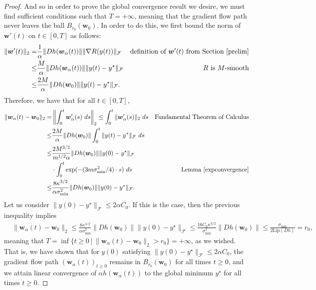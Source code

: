 \documentclass{article}
\begin{document}
\begin{proof}
And so in order to prove the global convergence result we desire, we must find sufficient conditions such that $T = + \infty$, meaning that the gradient flow path never leaves the ball $B_{r_0}(\boldsymbol{w}_0)$. In order to do this, we first bound the norm of $\boldsymbol{w}'(t)$ on $t \in [0, T]$ as follows:
\begin{align*}
    \| \boldsymbol{w}'(t) \|_2 =& \frac{1}{\alpha} \|Dh(\boldsymbol{w}_{\alpha}(t)) \| \| \nabla R(y(t))\|_{\mathcal{F}} & \text{definition of $\boldsymbol{w}'(t)$ from Section \ref{prelim}} \\
    \leq& \frac{M}{\alpha} \|Dh(\boldsymbol{w}_{\alpha}(t)) \|  \| y(t) - y^{\star} \|_{\mathcal{F}} & \text{$R$ is $M$-smooth}\\
    \leq& \frac{2M}{\alpha} \|Dh(\boldsymbol{w}_0) \|  \| y(t) - y^{\star} \|_{\mathcal{F}}.
\end{align*}
Therefore, we have that for all $t \in [0, T]$,
\begin{align*}
    \| \boldsymbol{w}_{\alpha}(t) - \boldsymbol{w}_0 \|_2 =& \left\Vert \int_0^t \boldsymbol{w}_{\alpha}'(s) \ ds \right\Vert_2 \leq \int_0^t \| \boldsymbol{w}_{\alpha}'(s) \|_2 \ ds & \text{Fundamental Theorem of Calculus}\\
    \leq& \frac{2M}{\alpha} \|Dh(\boldsymbol{w}_0) \| \int_0^t  \| y(t) - y^{\star} \|_{\mathcal{F}} \ ds\\
    \leq& \frac{2M^{3/2}}{m^{1/2}\alpha} \|Dh(\boldsymbol{w}_0) \| \|y(0) - y^{\star} \|_{\mathcal{F}}\\ 
    &\cdot\int_0^t  \exp(-(3m\sigma_{\text{min}}^2/4) \cdot s) \ ds & \text{Lemma \ref{expconvergence}}\\
    \leq& \frac{8\kappa^{3/2}}{\alpha \sigma_{\text{min}}^2} \|Dh(\boldsymbol{w}_0) \| \|y(0) - y^{\star} \|_{\mathcal{F}}.
\end{align*}
Let us consider $\|y(0) - y^{\star} \|_{\mathcal{F}} \leq 2 \alpha C_0$. If this is the case, then the previous inequality implies
\begin{align*}
    &\| \boldsymbol{w}_{\alpha}(t) - \boldsymbol{w}_0 \|_2 \leq \frac{8\kappa^{3/2}}{\alpha \sigma_{\text{min}}^2} \|Dh(\boldsymbol{w}_0) \| \|y(0) - y^{\star} \|_{\mathcal{F}} \leq \frac{16 C_0 \kappa^{3/2}}{ \sigma_{\text{min}}^2} \|Dh(\boldsymbol{w}_0) \| \leq \frac{\sigma_{\text{min}}}{2 \text{Lip}(Dh)} = r_0,
\end{align*}
meaning that $T = \inf\{t \geq 0 \ | \ \|\boldsymbol{w}_{\alpha}(t) - \boldsymbol{w}_0\|_2 > r_0\} = +\infty$, as we wished. That is, we have shown that for $y(0)$ satisfying  $\|y(0) - y^{\star} \|_{\mathcal{F}} \leq 2 \alpha C_0$,  the gradient flow path $(\boldsymbol{w}_{\alpha}(t))_{t \geq 0}$ remains in $B_{r_0}(\boldsymbol{w}_0)$ for all times $t \geq 0$, and we attain linear convergence of $\alpha h(\boldsymbol{w}_{\alpha}(t))$ to the global minimum $y^{\star}$ for all times $t \geq 0$. 


\end{proof}
\end{document}
